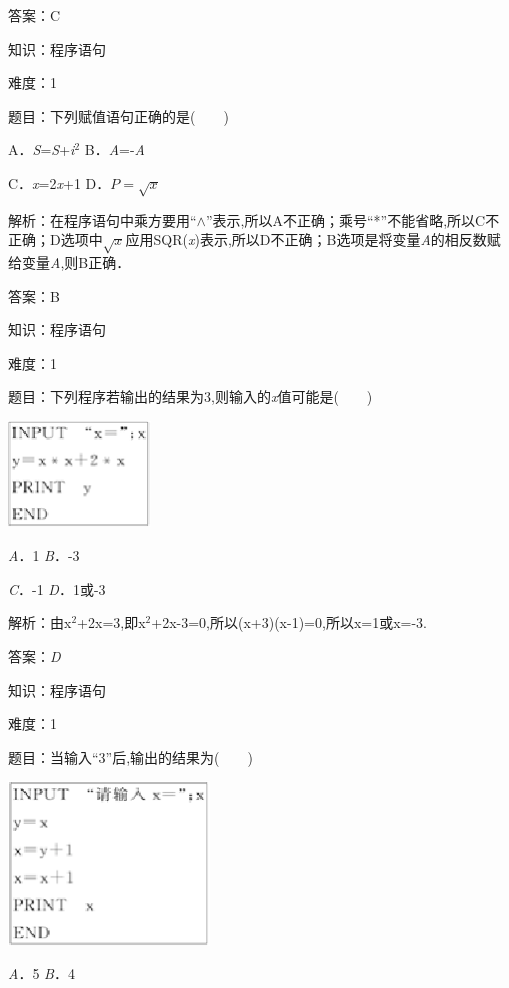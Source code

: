 \documentclass{article} %
\begin{document}
答案：C

知识：程序语句

难度：1

题目：下列赋值语句正确的是(　　)

A．\textit{S}=\textit{S}+\textit{i}${}^{2}$  B．\textit{A}=-\textit{A}

C．\textit{x}=2\textit{x}+1  D．$P=\sqrt{x}$

解析：在程序语句中乘方要用``$\mathrm{\wedge}$''表示,所以A不正确；乘号``*''不能省略,所以C不正确；D选项中$\sqrt{x}$应用SQR(\textit{x})表示,所以D不正确；B选项是将变量\textit{A}的相反数赋给变量\textit{A},则B正确．

答案：B

知识：程序语句

难度：1

题目：下列程序若输出的结果为3,则输入的\textit{x}值可能是(　　)

\includegraphics*[width=1.49in, height=1.11in, keepaspectratio=false]{image29}

\textit{A}．1     \textit{B}．-3

\textit{C}．-1   \textit{D}．1或-3

解析：由x${}^{2}$+2x=3,即x${}^{2}$+2x-3=0,所以(x+3)(x-1)=0,所以x=1或x=-3.

答案：\textit{D}

知识：程序语句

难度：1

题目：当输入``3''后,输出的结果为(　　)

                                                                                                        \includegraphics*[width=2.11in, height=1.71in, keepaspectratio=false]{image30}

\textit{A}．5  \textit{B}．4
\end{document}
